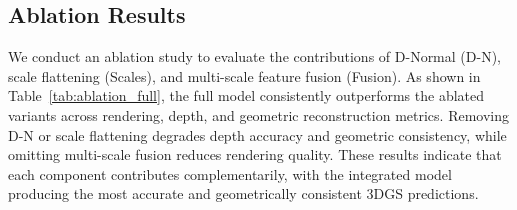 \subsection{Ablation Results}\label{subsec:ablation}
We conduct an ablation study to evaluate the contributions of D-Normal (D-N), scale flattening (Scales), and multi-scale feature fusion (Fusion). As shown in Table~\ref{tab:ablation_full}, the full model consistently outperforms the ablated variants across rendering, depth, and geometric reconstruction metrics. Removing D-N or scale flattening degrades depth accuracy and geometric consistency, while omitting multi-scale fusion reduces rendering quality. These results indicate that each component contributes complementarily, with the integrated model producing the most accurate and geometrically consistent 3DGS predictions.

